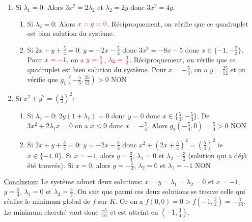 \documentclass{report}
\begin{document}
\begin{enumerate}
\item Si $\lambda_1=0$: \newline
Alors $3x^2=2\lambda_2$ et $\lambda_2=2y$ donc $3x^2=4y$.
\begin{enumerate}
\item Si $\lambda_2=0$:\newline
Alors $\color{red}{x=y=0}$. Réciproquement, on vérifie que ce quadruplet est bien solution du système.
\item Si $2x+y+\frac{5}{4}=0$: \newline
$y=-2x-\frac{5}{4}$ donc $3x^2=-8x-5$ donc $x\in \{-1,-\frac 53\}$.\newline
Pour $\color{red}{x=-1}$, on a $\color{red}{y=\frac 34}$, $\color{red}{\lambda_2 = \frac 32}$. Réciproquement, on vérifie que ce quadruplet est bien solution du système.\newline
Pour $x=-\frac 53$, on a $y=\frac{25}{12}$ et on vérifie que $g_1(-\frac 53, \frac{25}{12})>0$ NON
\end{enumerate}
\item Si $x^2+y^2= \left(\frac{5}{4}\right)^2$: \newline
\begin{enumerate}
\item Si $\lambda_2=0$:\newline 
$2y(1+\lambda_1)=0$ donc $y=0$ donc $x\in \{\frac 54, -\frac 54\}$.\newline
De $3x^2+2\lambda_1x=0$ on a $x\leq 0$ donc $x=-\frac 54$.\newline
Alors $g_2(-\frac 54, 0) = \frac 54>0$ NON
\item Si $2x+y+\frac 54=0$: \newline
$y=-2x-\frac 54$ donc $x^2+(2x+\frac 54)^2=\left(\frac 54 \right)^2$ ie $x\in \{-1,0\}$.\newline
Si $x=-1$, alors $y=\frac 34$, $\lambda_1=0$ et $\lambda_2=\frac 32$ (solution qui a déjà été trouvée). \newline
Si $x=0$, alors $y=-\frac 54$, $\lambda_2=0$ et $\lambda_1=-1$ NON
\end{enumerate}
\end{enumerate}
\underline{Conclusion}: Le système admet deux solutions: $x=y=\lambda_1=\lambda_2=0$ et $x=-1$, $y=\frac 34$, $\lambda_1=0$ et $\lambda_2=\frac 32$. On sait que parmi ces deux solutions se trouve celle qui réalise le minimum global de $f$ sur $K$. Or on a $f(0,0)=0>f(-1,\frac 34)=-\frac{7}{16}$. Le minimum cherché vaut donc $\frac{-7}{16}$ et est atteint en $(-1,\frac 34)$.\newline
\end{document}

